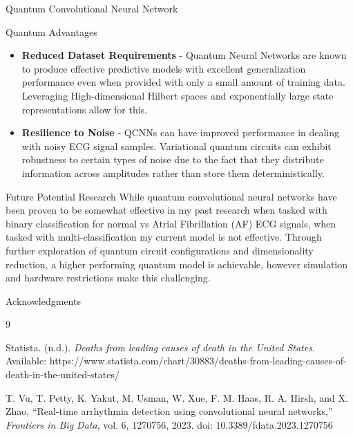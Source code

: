 \documentclass[final]{beamer}
\newlength{\colwidth}
\begin{document}
\begin{frame}[t]
\begin{columns}[t]
\begin{column}{\colwidth}
\begin{block}{Quantum Convolutional Neural Network}
				\end{block}
				
				
				\begin{block}{Quantum Advantages}
					
					\begin{itemize}
						
						\item \textbf{Reduced Dataset Requirements} - Quantum Neural Networks are known to produce effective predictive models with excellent generalization performance even when provided with only a small amount of training data. Leveraging High-dimensional Hilbert spaces and exponentially large state representations allow for this. 
						 
						
						\item \textbf{Resilience to Noise} - QCNNs can have improved performance in dealing with noisy ECG signal samples. Variational quantum circuits can exhibit robustness to certain types of noise due to the fact that they distribute information across amplitudes rather than store them deterministically.
					\end{itemize}
				\end{block}
				
				
				\begin{exampleblock}{Future Potential Research}
					While quantum convolutional neural networks have been proven to be somewhat effective in my past research when tasked with binary classification for normal vs Atrial Fibrillation (AF) ECG signals, when tasked with multi-classification my current model is not effective. Through further exploration of quantum circuit configurations and dimensionality reduction, a higher performing quantum model is achievable, however simulation and hardware restrictions make this challenging. 
				\end{exampleblock}
				
				\begin{block}{Acknowledgments}
					\begin{thebibliography}{9}
						
						Statista. (n.d.). \textit{Deaths from leading causes of death in the United States}. 
						Available: https://www.statista.com/chart/30883/deaths-from-leading-causes-of-death-in-the-united-states/
						
						T. Vu, T. Petty, K. Yakut, M. Usman, W. Xue, F. M. Haas, R. A. Hirsh, and X. Zhao, 
						``Real-time arrhythmia detection using convolutional neural networks,'' 
						\textit{Frontiers in Big Data}, vol. 6, 1270756, 2023. 
						doi: 10.3389/fdata.2023.1270756
						

\end{thebibliography}
\end{block}
\end{column}
\end{columns}
\end{frame}
\end{document}
